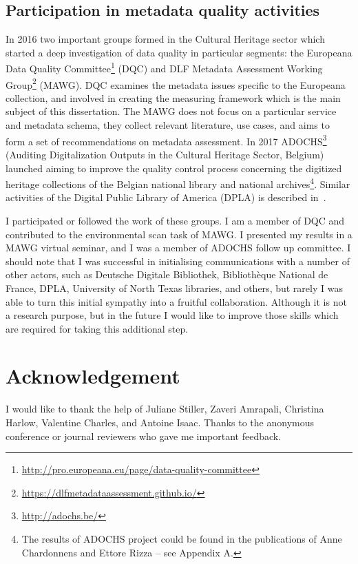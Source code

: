 \subsection{Participation in metadata quality activities}

In 2016 two important groups formed in the Cultural Heritage sector which started a deep investigation of data quality in particular segments: the Europeana Data Quality Committee\footnote{\url{http://pro.europeana.eu/page/data-quality-committee}} (DQC) and DLF Metadata Assessment Working Group\footnote{\url{https://dlfmetadataassessment.github.io/}} (MAWG). DQC examines the metadata issues specific to the Europeana collection, and involved in creating the measuring framework which is the main subject of this dissertation. The MAWG does not focus on a particular service and metadata schema, they collect relevant literature, use cases, and aims to form a set of recommendations on metadata assessment. In 2017 ADOCHS\footnote{\url{http://adochs.be/}} (Auditing Digitalization Outputs in the Cultural Heritage Sector, Belgium) launched aiming to improve the quality control process concerning the digitized heritage collections of the Belgian national library and national archives\footnote{The results of ADOCHS project could be found in the publications of Anne Chardonnens and Ettore Rizza -- see Appendix A.}. Similar activities of the Digital Public Library of America (DPLA) is described in~\cite{gueguen2019}.

I participated or followed the work of these groups. I am a member of DQC and contributed to the environmental scan task of MAWG. I presented my results in a MAWG virtual seminar, and I was a member of ADOCHS follow up committee. I should note that I was successful in initialising communications with a number of other actors, such as Deutsche Digitale Bibliothek, Bibliothèque National de France, DPLA, University of North Texas libraries, and others, but rarely I was able to turn this initial sympathy into a fruitful collaboration. Although it is not a research purpose, but in the future I would like to improve those skills which are required for taking this additional step.

\section{Acknowledgement}

I would like to thank the help of Juliane Stiller, Zaveri Amrapali, Christina Harlow, Valentine Charles, and Antoine Isaac. Thanks to the anonymous conference or journal reviewers who gave me important feedback.

